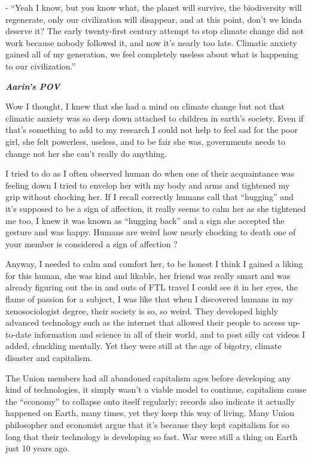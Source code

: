 \documentclass[hidelinks,12pt,a4paper]{book}
\begin{document}
- “Yeah I know, but you know what, the planet will survive, the biodiversity will regenerate, only our civilization 
will disappear, and at this point, don't we kinda deserve it? The early twenty-first century attempt to stop climate 
change did not work because nobody followed it, and now it's nearly too late. Climatic anxiety gained all of my generation,
we feel completely useless about what is happening to our civilization.”\par
\bigskip

\textit{\textbf{Aarin's POV}}\par
\bigskip

Wow I thought, I knew that she had a mind on climate change but not that climatic anxiety was so deep down attached 
to children in earth's society. Even if that's something to add to my research I could not help to feel sad for the
 poor girl, she felt powerless, useless, and to be fair she was, governments needs to change not her she can't really 
 do anything. \par
 \bigskip

I tried to do as I often observed human do when one of their acquaintance was feeling down I tried to envelop her 
with my body and arms and tightened my grip without chocking her. If I recall correctly humans call that “hugging”
 and it's supposed to be a sign of affection, it really seems to calm her as she tightened me too, I knew it was known 
 as “hugging back” and a sign she accepted the gesture and was happy. Humans are weird how nearly chocking 
 to death one of your member is considered a sign of affection ?\par
 \bigskip

Anyway, I needed to calm and comfort her, to be honest I think I gained a liking for this human, she was kind and likable, 
her friend was really smart and was already figuring out the in and outs of FTL travel I could see it in her eyes,
 the flame of passion for a subject, I was like that when I discovered humans in my xenosociologist degree, their 
 society is so, so weird. They developed highly advanced technology such as the internet that allowed their people 
 to access up-to-date information and science in all of their world, and to post silly cat videos I added, chuckling 
 mentally. Yet they were still at the age of bigotry, climate disaster and capitalism.\par
 \bigskip

The Union members had all abandoned capitalism ages before developing any kind of technologies, 
it simply wasn't a viable model to continue, capitalism cause the “economy” to collapse onto itself regularly;
 records also indicate it actually happened on Earth, many times, yet they keep this way of living. 
 Many Union philosopher and economist argue that it's because they kept capitalism for so long that their 
 technology is developing so fast. War were still a thing on Earth just 10 years ago.\par
 \bigskip
\end{document}
